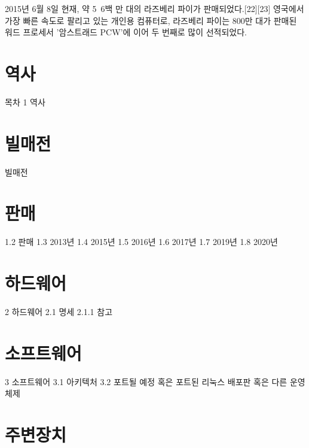 \documentclass[12pt, a4paper, oneside]{book}
\let\stdsection\section
\renewcommand\section{\newpage\stdsection}
\begin{document}
2015년 6월 8일 현재, 약 5~6백 만 대의 라즈베리 파이가 판매되었다.[22][23] 영국에서 가장 빠른 속도로 팔리고 있는 개인용 컴퓨터로, 라즈베리 파이는 800만 대가 판매된 워드 프로세서 '암스트래드 PCW'에 이어 두 번째로 많이 선적되었다.




%
	\section{ 역사}



목차
1	역사
	\section{ 빌매전}


빌매전

	\section{ 판매}

1.2	판매
1.3	2013년
1.4	2015년
1.5	2016년
1.6	2017년
1.7	2019년
1.8	2020년

	\section{ 하드웨어}

2	하드웨어
2.1	명세
2.1.1	참고


	\section{ 소프트웨어}

3	소프트웨어
3.1	아키텍처
3.2	포트될 예정 혹은 포트된 리눅스 배포판 혹은 다른 운영 체제

	\section{ 주변장치}
\end{document}
